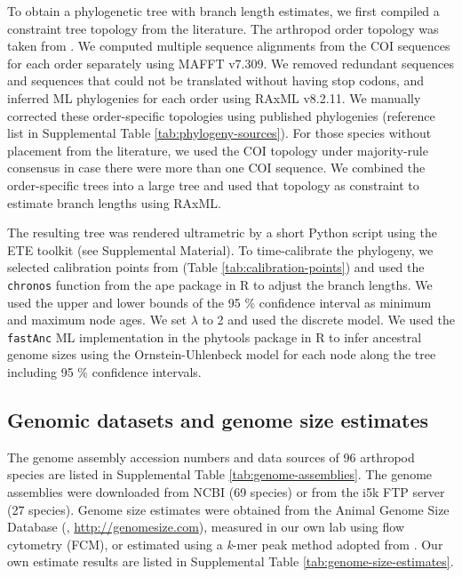 To obtain a phylogenetic tree with branch length estimates, we first
compiled a constraint tree topology from the literature. The arthropod
order topology was taken from \citet{Misof2014}. We computed multiple
sequence alignments from the COI sequences for each order separately
using MAFFT v7.309. We removed redundant sequences and sequences that
could not be translated without having stop codons, and inferred ML
phylogenies for each order using RAxML v8.2.11. We manually corrected
these order-specific topologies using published phylogenies (reference
list in Supplemental Table \ref{tab:phylogeny-sources}). For those species without placement from
the literature, we used the COI topology under majority-rule consensus
in case there were more than one COI sequence. We combined the
order-specific trees into a large tree and used that topology as
constraint to estimate branch lengths using RAxML.

The resulting tree was rendered ultrametric by a short Python script
using the ETE toolkit \citep{Huerta-Cepas2016} (see Supplemental Material). To
time-calibrate the phylogeny, we selected calibration points from
\citep{Misof2014} (Table \ref{tab:calibration-points}) and used the \texttt{chronos} function
from the ape package in R to adjust the branch lengths. We used the
upper and lower bounds of the 95 \% confidence interval as minimum and
maximum node ages. We set \(\lambda\) to 2 and used the discrete
model. We used the \texttt{fastAnc} ML implementation in the phytools
package \citep{Revell2012} in R to infer ancestral genome sizes using
the Ornstein-Uhlenbeck model for each node along the tree including 95
\% confidence intervals.

\subsection*{Genomic datasets and genome size
estimates}

The genome assembly accession numbers and data sources of 96 arthropod
species are listed in Supplemental Table \ref{tab:genome-assemblies}. The genome assemblies were
downloaded from NCBI (69 species) or from the i5k FTP server (27
species). Genome size estimates were obtained from the Animal Genome
Size Database (\citet{Gregory2018}, \url{http://genomesize.com}),
measured in our own lab using flow cytometry (FCM), or estimated using a
\emph{k}-mer peak method adopted from \citet{Hozza2015}. Our own
estimate results are listed in Supplemental Table
\ref{tab:genome-size-estimates}.

